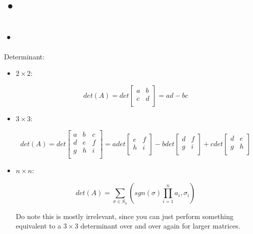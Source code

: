 \documentclass{report}
\begin{document}
\section{•}

\subsection{•}
Determinant:
\begin{itemize}
\item$2\times2$:

$$det(A)=det\begin{bmatrix}a&b\\c&d\\\end{bmatrix}=ad-bc$$
\item$3\times3$:

$$det(A)=det\begin{bmatrix}a&b&c\\d&e&f\\g&h&i\\\end{bmatrix}=adet\begin{bmatrix}e&f\\h&i\\\end{bmatrix}-bdet\begin{bmatrix}d&f\\g&i\\\end{bmatrix}+cdet\begin{bmatrix}d&e\\g&h\\\end{bmatrix}$$

\item$n\times n$:

$$det(A)=\sum_{\sigma\in S_n}(sgn(\sigma)\prod_{i=1}^{n}a_i,\sigma_i )$$

Do note this is mostly irrelevant, since you can just perform something equivalent to a $3\times3$ determinant over and over again for larger matrices.
\end{itemize}
\end{document}
